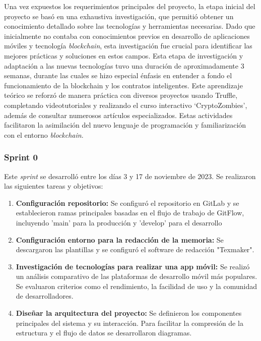 Una vez expuestos los requerimientos principales del proyecto, la etapa inicial del proyecto se basó en una exhaustiva investigación, que permitió obtener un conocimiento detallado sobre las tecnologías y herramientas necesarias. Dado que inicialmente no contaba con conocimientos previos en desarrollo de aplicaciones móviles y tecnología \textit{blockchain}, esta investigación fue crucial para identificar las mejores prácticas y soluciones en estos campos. 
Esta etapa de investigación y adaptación a las nuevas tecnologías tuvo una duración de aproximadamente 3 semanas, durante las cuales se hizo especial énfasis en entender a fondo el funcionamiento de la blockchain y los contratos inteligentes.
Este aprendizaje teórico se reforzó de manera práctica con diversos proyectos usando Truffle, completando videotutoriales y realizando el curso interactivo `CryptoZombies', además de consultar numerosos artículos especializados. Estas actividades facilitaron la asimilación del nuevo lenguaje de programación y familiarización con el entorno \textit{blockchain}.


\subsubsection{Sprint 0}

Este \textit{sprint} se desarrolló entre los días 3 y 17 de noviembre de 2023. Se realizaron las siguientes tareas y objetivos:

\begin{enumerate}

\item \textbf{Configuración repositorio:} Se configuró el repositorio en GitLab y se establecieron ramas principales basadas en el flujo de trabajo de GitFlow, incluyendo 'main' para la producción y 'develop' para el desarrollo 

\item \textbf{Configuración entorno para la redacción de la memoria:} Se descargaron las plantillas y se configuró el software de redacción "Texmaker".

\item \textbf{Investigación de tecnologías para realizar una app móvil:} Se realizó un análisis comparativo de las plataformas de desarrollo móvil más populares. Se evaluaron criterios como el rendimiento, la facilidad de uso y la comunidad de desarrolladores.

\item \textbf{Diseñar la arquitectura del proyecto:} Se definieron los componentes principales del sistema y su interacción. Para facilitar la compresión de la estructura y el flujo de datos se desarrollaron diagramas.

\end{enumerate}


